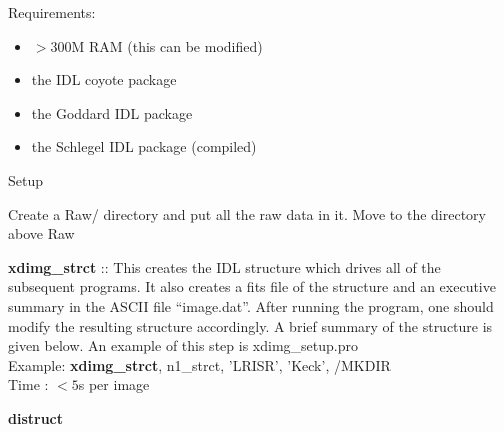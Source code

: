\documentclass[11pt,letterpaper,dvips]{article}
\begin{document}
\pagestyle{empty}
 


\begin{enumerate}

{\Large  \item Requirements:  }
	\begin{itemize}
		\item $>$300M RAM (this can be modified)
		\item the IDL coyote package 
		\item the Goddard IDL package
		\item the Schlegel IDL package (compiled)
	\end{itemize}

{\Large  \item Setup }

  \begin{Aenumerate}

    \item Create a Raw/ directory and put all the raw data in it.  Move
	to the directory above Raw

    \item {\bf xdimg\_strct} :: This creates the IDL structure which 
	drives all of the subsequent programs.  It also creates a fits file
	of the structure and an executive summary in the ASCII file 
	``image.dat''.  After running the program, one should 
	modify the resulting structure accordingly.  A brief summary of
	the structure is given below.  An example of this step
	is xdimg\_setup.pro \\
         \quad Example: {\bf xdimg\_strct}, n1\_strct, 'LRISR', 'Keck', /MKDIR\\
         \quad Time   : $<5$s per image

    \item {\bf distruct}


\end{Aenumerate}
\end{enumerate}
\end{document}
